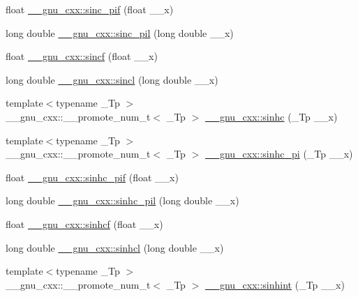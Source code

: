 \begin{DoxyCompactItemize}
\item 
float \hyperlink{group__gnu__math__spec__func_gad92d43d5332c80d1a27c90bfe3f6417e}{\+\_\+\+\_\+gnu\+\_\+cxx\+::sinc\+\_\+pif} (float \+\_\+\+\_\+x)
\item 
long double \hyperlink{group__gnu__math__spec__func_gaad38a6e40b1272391a26dbb32a684b3c}{\+\_\+\+\_\+gnu\+\_\+cxx\+::sinc\+\_\+pil} (long double \+\_\+\+\_\+x)
\item 
float \hyperlink{group__gnu__math__spec__func_gaa87f0734cfe7823c932511ac2f0a876c}{\+\_\+\+\_\+gnu\+\_\+cxx\+::sincf} (float \+\_\+\+\_\+x)
\item 
long double \hyperlink{group__gnu__math__spec__func_ga79a8fd931f5ad4f737e2931e636149ac}{\+\_\+\+\_\+gnu\+\_\+cxx\+::sincl} (long double \+\_\+\+\_\+x)
\item 
{\footnotesize template$<$typename \+\_\+\+Tp $>$ }\\\+\_\+\+\_\+gnu\+\_\+cxx\+::\+\_\+\+\_\+promote\+\_\+num\+\_\+t$<$ \+\_\+\+Tp $>$ \hyperlink{group__gnu__math__spec__func_gad6975a69b8e40a6237b4124b459c6181}{\+\_\+\+\_\+gnu\+\_\+cxx\+::sinhc} (\+\_\+\+Tp \+\_\+\+\_\+x)
\item 
{\footnotesize template$<$typename \+\_\+\+Tp $>$ }\\\+\_\+\+\_\+gnu\+\_\+cxx\+::\+\_\+\+\_\+promote\+\_\+num\+\_\+t$<$ \+\_\+\+Tp $>$ \hyperlink{group__gnu__math__spec__func_ga59ba25b4276fea8c628629420b522b15}{\+\_\+\+\_\+gnu\+\_\+cxx\+::sinhc\+\_\+pi} (\+\_\+\+Tp \+\_\+\+\_\+x)
\item 
float \hyperlink{group__gnu__math__spec__func_ga26e54504db6541550266140f5264acbe}{\+\_\+\+\_\+gnu\+\_\+cxx\+::sinhc\+\_\+pif} (float \+\_\+\+\_\+x)
\item 
long double \hyperlink{group__gnu__math__spec__func_gaa572bf7633f457c86cef65bfd6ec4ad9}{\+\_\+\+\_\+gnu\+\_\+cxx\+::sinhc\+\_\+pil} (long double \+\_\+\+\_\+x)
\item 
float \hyperlink{group__gnu__math__spec__func_gadaa7ea78625cc2eeb70213a50719813d}{\+\_\+\+\_\+gnu\+\_\+cxx\+::sinhcf} (float \+\_\+\+\_\+x)
\item 
long double \hyperlink{group__gnu__math__spec__func_ga7467a001bb18ef8bff0a7e9927bab356}{\+\_\+\+\_\+gnu\+\_\+cxx\+::sinhcl} (long double \+\_\+\+\_\+x)
\item 
{\footnotesize template$<$typename \+\_\+\+Tp $>$ }\\\+\_\+\+\_\+gnu\+\_\+cxx\+::\+\_\+\+\_\+promote\+\_\+num\+\_\+t$<$ \+\_\+\+Tp $>$ \hyperlink{group__gnu__math__spec__func_ga19941fbce9fb8e097eb757761f9326db}{\+\_\+\+\_\+gnu\+\_\+cxx\+::sinhint} (\+\_\+\+Tp \+\_\+\+\_\+x)

\end{DoxyCompactItemize}
